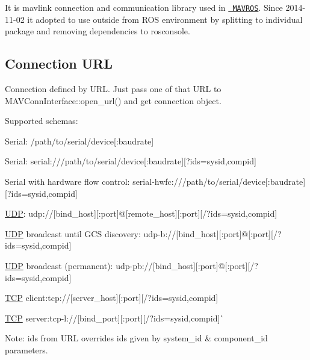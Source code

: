 It is mavlink connection and communication library used in \href{https://github.com/mavlink/mavros}{\texttt{ M\+A\+V\+R\+OS}}. Since 2014-\/11-\/02 it adopted to use outside from R\+OS environment by splitting to individual package and removing dependencies to rosconsole.

\subsection*{Connection U\+RL }

Connection defined by U\+RL. Just pass one of that U\+RL to {\ttfamily M\+A\+V\+Conn\+Interface\+::open\+\_\+url()} and get connection object.

Supported schemas\+:


\begin{DoxyItemize}
\item Serial\+: {\ttfamily /path/to/serial/device\mbox{[}\+:baudrate\mbox{]}}
\item Serial\+: {\ttfamily serial\+:///path/to/serial/device\mbox{[}\+:baudrate\mbox{]}\mbox{[}?ids=sysid,compid\mbox{]}}
\item Serial with hardware flow control\+: {\ttfamily serial-\/hwfc\+:///path/to/serial/device\mbox{[}\+:baudrate\mbox{]}\mbox{[}?ids=sysid,compid\mbox{]}}
\item \mbox{\hyperlink{classUDP}{U\+DP}}\+: {\ttfamily udp\+://\mbox{[}bind\+\_\+host\mbox{]}\mbox{[}\+:port\mbox{]}@\mbox{[}remote\+\_\+host\mbox{]}\mbox{[}\+:port\mbox{]}\mbox{[}/?ids=sysid,compid\mbox{]}}
\item \mbox{\hyperlink{classUDP}{U\+DP}} broadcast until G\+CS discovery\+: {\ttfamily udp-\/b\+://\mbox{[}bind\+\_\+host\mbox{]}\mbox{[}\+:port\mbox{]}@\mbox{[}\+:port\mbox{]}\mbox{[}/?ids=sysid,compid\mbox{]}}
\item \mbox{\hyperlink{classUDP}{U\+DP}} broadcast (permanent)\+: {\ttfamily udp-\/pb\+://\mbox{[}bind\+\_\+host\mbox{]}\mbox{[}\+:port\mbox{]}@\mbox{[}\+:port\mbox{]}\mbox{[}/?ids=sysid,compid\mbox{]}}
\item {\ttfamily \mbox{\hyperlink{classTCP}{T\+CP}} client\+:}tcp\+://\mbox{[}server\+\_\+host\mbox{]}\mbox{[}\+:port\mbox{]}\mbox{[}/?ids=sysid,compid\mbox{]}{\ttfamily }
\item {\ttfamily \mbox{\hyperlink{classTCP}{T\+CP}} server\+:}tcp-\/l\+://\mbox{[}bind\+\_\+port\mbox{]}\mbox{[}\+:port\mbox{]}\mbox{[}/?ids=sysid,compid\mbox{]}\`{}
\end{DoxyItemize}

Note\+: ids from U\+RL overrides ids given by system\+\_\+id \& component\+\_\+id parameters.

